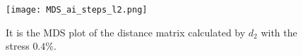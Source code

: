       \begin{figure}
        \centering
        \texttt{[image: MDS\_ai\_steps\_l2.png]}
        \caption{It is the MDS plot of the distance matrix calculated
          by $d_2$ with the stress $0.4\%$.}
        \label{fig:MDS_ai_steps_l2}
      \end{figure}

      
      



       



       


























      
